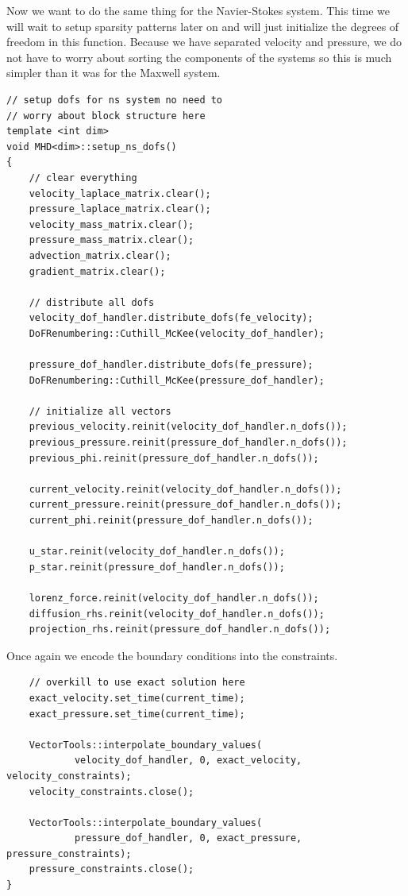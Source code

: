 \documentclass{article}
\begin{document}
Now we want to do the same thing for the Navier-Stokes system. This time we will wait to setup sparsity patterns later on and will just initialize the degrees of freedom in this function. Because we have separated velocity and pressure, we do not have to worry about sorting the components of the systems so this is much simpler than it was for the Maxwell system. 
\begin{lstlisting}
// setup dofs for ns system no need to
// worry about block structure here
template <int dim>
void MHD<dim>::setup_ns_dofs()
{
    // clear everything
    velocity_laplace_matrix.clear();
    pressure_laplace_matrix.clear();
    velocity_mass_matrix.clear();
    pressure_mass_matrix.clear();
    advection_matrix.clear();
    gradient_matrix.clear();

    // distribute all dofs
    velocity_dof_handler.distribute_dofs(fe_velocity);
    DoFRenumbering::Cuthill_McKee(velocity_dof_handler);

    pressure_dof_handler.distribute_dofs(fe_pressure);
    DoFRenumbering::Cuthill_McKee(pressure_dof_handler);

    // initialize all vectors
    previous_velocity.reinit(velocity_dof_handler.n_dofs());
    previous_pressure.reinit(pressure_dof_handler.n_dofs());
    previous_phi.reinit(pressure_dof_handler.n_dofs());

    current_velocity.reinit(velocity_dof_handler.n_dofs());
    current_pressure.reinit(pressure_dof_handler.n_dofs());
    current_phi.reinit(pressure_dof_handler.n_dofs());

    u_star.reinit(velocity_dof_handler.n_dofs());
    p_star.reinit(pressure_dof_handler.n_dofs());

    lorenz_force.reinit(velocity_dof_handler.n_dofs());
    diffusion_rhs.reinit(velocity_dof_handler.n_dofs());
    projection_rhs.reinit(pressure_dof_handler.n_dofs());
\end{lstlisting}
Once again we encode the boundary conditions into the constraints.
\begin{lstlisting}
    // overkill to use exact solution here
    exact_velocity.set_time(current_time);
    exact_pressure.set_time(current_time);

    VectorTools::interpolate_boundary_values(
            velocity_dof_handler, 0, exact_velocity, velocity_constraints);
    velocity_constraints.close();

    VectorTools::interpolate_boundary_values(
            pressure_dof_handler, 0, exact_pressure, pressure_constraints);
    pressure_constraints.close();
}
\end{lstlisting}
\end{document}
